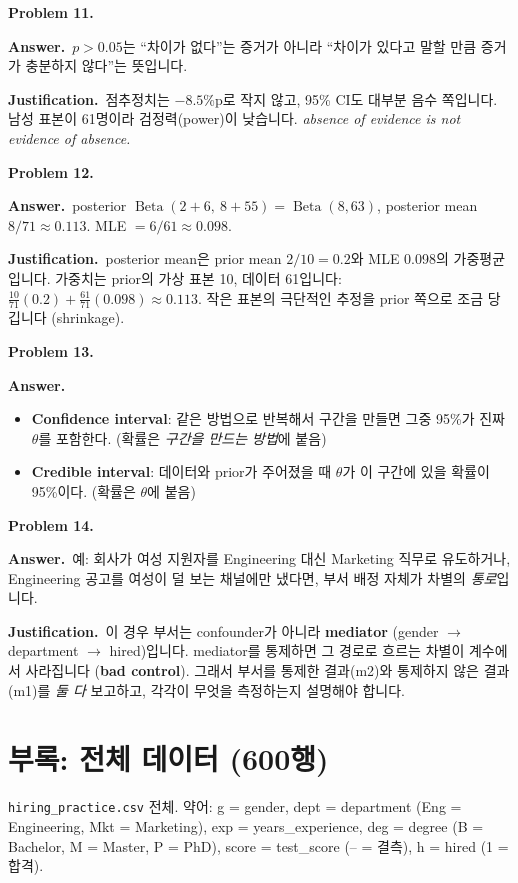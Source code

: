 \documentclass[11pt,a4paper]{article}
\newcommand{\BetaD}{\operatorname{Beta}}
\newcommand{\term}[1]{\textbf{#1}}
\newcommand{\code}[1]{\texttt{#1}}
\newcommand{\Ans}{\par\textbf{Answer.}\ }
\newcommand{\Just}{\par\textbf{Justification.}\ }
\begin{document}
\textbf{Problem 11.}
\Ans $p>0.05$는 ``차이가 없다''는 증거가 아니라 ``차이가 있다고 말할 만큼 증거가 충분하지 않다''는 뜻입니다.
\Just 점추정치는 $-8.5$\%p로 작지 않고, 95\% CI도 대부분 음수 쪽입니다. 남성 표본이 61명이라 검정력(power)이 낮습니다. \emph{absence of evidence is not evidence of absence.}

\textbf{Problem 12.}
\Ans posterior $\BetaD(2+6,\ 8+55)=\BetaD(8,63)$, posterior mean $8/71\approx0.113$. MLE $=6/61\approx0.098$.
\Just posterior mean은 prior mean $2/10=0.2$와 MLE 0.098의 가중평균입니다. 가중치는 prior의 가상 표본 10, 데이터 61입니다: $\frac{10}{71}(0.2)+\frac{61}{71}(0.098)\approx0.113$. 작은 표본의 극단적인 추정을 prior 쪽으로 조금 당깁니다 (shrinkage).

\textbf{Problem 13.}
\Ans
\begin{itemize}
\item \textbf{Confidence interval}: 같은 방법으로 반복해서 구간을 만들면 그중 95\%가 진짜 $\theta$를 포함한다. (확률은 \emph{구간을 만드는 방법}에 붙음)
\item \textbf{Credible interval}: 데이터와 prior가 주어졌을 때 $\theta$가 이 구간에 있을 확률이 95\%이다. (확률은 \emph{$\theta$}에 붙음)
\end{itemize}

\textbf{Problem 14.}
\Ans 예: 회사가 여성 지원자를 Engineering 대신 Marketing 직무로 유도하거나, Engineering 공고를 여성이 덜 보는 채널에만 냈다면, 부서 배정 자체가 차별의 \emph{통로}입니다.
\Just 이 경우 부서는 confounder가 아니라 \term{mediator} (gender $\to$ department $\to$ hired)입니다. mediator를 통제하면 그 경로로 흐르는 차별이 계수에서 사라집니다 (\term{bad control}). 그래서 부서를 통제한 결과(m2)와 통제하지 않은 결과(m1)를 \emph{둘 다} 보고하고, 각각이 무엇을 측정하는지 설명해야 합니다.

\section*{부록: 전체 데이터 (600행)}
\code{hiring\_practice.csv} 전체. 약어: g = gender, dept = department (Eng = Engineering, Mkt = Marketing), exp = years\_experience, deg = degree (B = Bachelor, M = Master, P = PhD), score = test\_score (-- = 결측), h = hired (1 = 합격).
\end{document}
